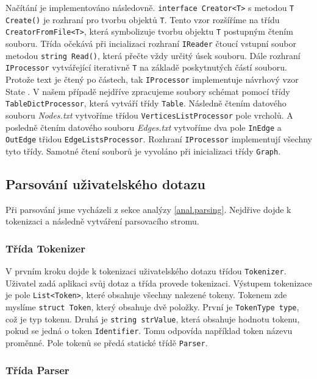 Načítání je implementováno následovně.
\texttt{interface Creator<T>} s metodou \texttt{T Create()} je rozhraní pro tvorbu objektů \texttt{T}.
Tento vzor rozšíříme na třídu \texttt{CreatorFromFile<T>}, která symbolizuje tvorbu objektu \texttt{T} postupným čtením souboru.
Třída očekává při incializaci rozhraní \texttt{IReader} čtoucí vstupní soubor metodou \texttt{string Read()}, která přečte vždy určitý úsek souboru.
Dále rozhraní \texttt{IProcessor} vytvářející iterativně \texttt{T} na základě poskytnutých částí souboru.
Protože text je čtený po částech, tak \texttt{IProcessor} implementuje návrhový vzor State \citep[str. 305]{patterns}.
V našem případě nejdříve zpracujeme soubory schémat pomocí třídy \texttt{TableDictProcessor}, která vytváří třídy \texttt{Table}.
Následně čtením datového souboru \textit{Nodes.txt} vytvoříme třídou \texttt{VerticesListProcessor} pole vrcholů.
A posledně čtením datového souboru \textit{Edges.txt} vytvoříme dva pole \texttt{InEdge} a \texttt{OutEdge} třidou \texttt{EdgeListsProcessor}. 
Rozhraní \texttt{IProcessor} implementují všechny tyto třídy.
Samotné čtení souborů je vyvoláno při inicializaci třídy \texttt{Graph}.

\subsection{Parsování uživatelského dotazu}

Při parsování jsme vycházeli z sekce analýzy \ref{anal.parsing}.
Nejdřive dojde k tokenizaci a následně vytváření parsovacího stromu.

\subsubsection{Třída Tokenizer}

V prvním kroku dojde k tokenizaci uživatelského dotazu třídou \texttt{Tokenizer}.
Uživatel zadá aplikaci svůj dotaz a třída provede tokenizaci.
Výstupem tokenizace je pole \texttt{List<Token>}, které obsahuje všechny nalezené tokeny.
Tokenem zde myslíme \texttt{struct Token}, který obsahuje dvě položky.
První je \texttt{TokenType type}, což je typ tokenu.
Druhá je \texttt{string strValue}, která obsahuje hodnotu tokenu, pokud se jedná o token \texttt{Identifier}.
Tomu odpovída například token názevu proměnné.
Pole tokenů se předá statické třídě \texttt{Parser}.

\subsubsection{Třída Parser}

